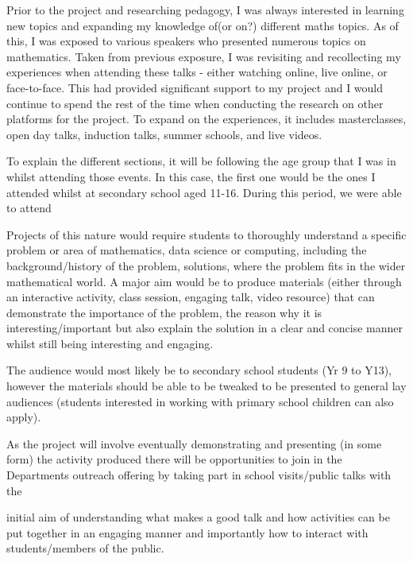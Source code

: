 \documentclass{article}
\begin{document}
Prior to the project and researching pedagogy, I was always interested in learning new topics and expanding my knowledge of(or on?) different maths topics. As of this, I was exposed to various speakers who presented numerous topics on mathematics. Taken from previous exposure, I was revisiting and recollecting my experiences when attending these talks - either watching online, live online, or face-to-face. This had provided significant support to my project and I would continue to spend the rest of the time when conducting the research on other platforms for the project. To expand on the experiences, it includes masterclasses, open day talks, induction talks, summer schools, and live videos.

To explain the different sections, it will be following the age group that I was in whilst attending those events. In this case, the first one would be the ones I attended whilst at secondary school aged 11-16. During this period, we were able to attend

Projects of this nature would require students to thoroughly understand a specific problem
or area of mathematics, data science or computing, including the background/history of the
problem, solutions, where the problem fits in the wider mathematical world. A major aim
would be to produce materials (either through an interactive activity, class session, engaging
talk, video resource) that can demonstrate the importance of the problem, the reason why it
is interesting/important but also explain the solution in a clear and concise manner whilst
still being interesting and engaging.

The audience would most likely be to secondary school
students (Yr 9 to Y13), however the materials should be able to be tweaked to be presented
to general lay audiences (students interested in working with primary school children can
also apply).

As the project will involve eventually demonstrating and presenting (in some
form) the activity produced there will be opportunities to join in the Departments outreach
offering by taking part in school visits/public talks with the

initial aim of understanding
what makes a good talk and how activities can be put together in an engaging manner and
importantly how to interact with students/members of the public.
\end{document}
